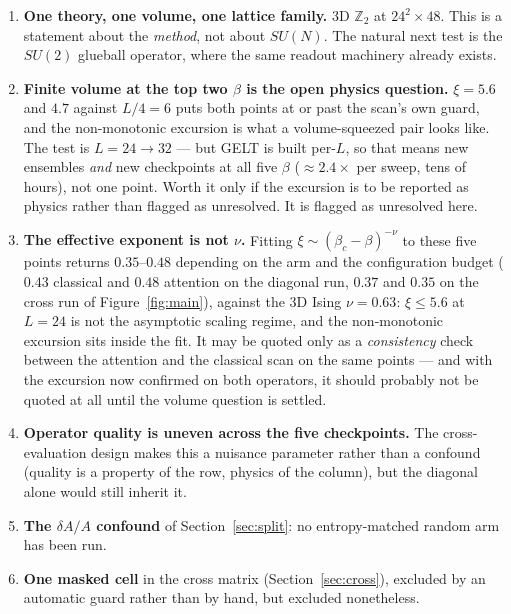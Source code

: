 \documentclass[11pt,a4paper]{article}
\begin{document}
\begin{enumerate}
  \item \textbf{One theory, one volume, one lattice family.} 3D $\mathbb{Z}_2$
        at $24^2\times48$. This is a statement about the \emph{method}, not
        about $SU(N)$. The natural next test is the $SU(2)$ glueball operator,
        where the same readout machinery already exists.
  \item \textbf{Finite volume at the top two $\beta$ is the open physics
        question.} $\xi = 5.6$ and $4.7$ against $L/4 = 6$ puts both points at
        or past the scan's own guard, and the non-monotonic excursion is what a
        volume-squeezed pair looks like. The test is $L = 24 \to 32$ --- but
        GELT is built per-$L$, so that means new ensembles \emph{and} new
        checkpoints at all five $\beta$ ($\approx2.4\times$ per sweep, tens of
        hours), not one point. Worth it only if the excursion is to be reported
        as physics rather than flagged as unresolved. It is flagged as
        unresolved here.
  \item \textbf{The effective exponent is not $\nu$.} Fitting
        $\xi \sim (\beta_c-\beta)^{-\nu}$ to these five points returns
        $0.35$--$0.48$ depending on the arm and the configuration budget
        ($0.43$ classical and $0.48$ attention on the diagonal run, $0.37$ and
        $0.35$ on the cross run of Figure~\ref{fig:main}), against the 3D Ising
        $\nu = 0.63$: $\xi \le 5.6$ at $L=24$ is not the asymptotic scaling
        regime, and the non-monotonic excursion sits inside the fit. It may be
        quoted only as a \emph{consistency} check between the attention and the
        classical scan on the same points --- and with the excursion now
        confirmed on both operators, it should probably not be quoted at all
        until the volume question is settled.
  \item \textbf{Operator quality is uneven across the five checkpoints.} The
        cross-evaluation design makes this a nuisance parameter rather than a
        confound (quality is a property of the row, physics of the column), but
        the diagonal alone would still inherit it.
  \item \textbf{The $\delta A/A$ confound} of Section~\ref{sec:split}: no
        entropy-matched random arm has been run.
  \item \textbf{One masked cell} in the cross matrix (Section~\ref{sec:cross}),
        excluded by an automatic guard rather than by hand, but excluded
        nonetheless.
\end{enumerate}
\end{document}
